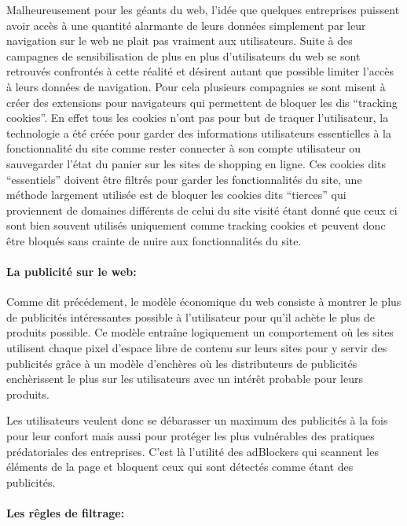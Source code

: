 \documentclass[oneside,a4paper,12pt]{article}
\begin{document}
Malheureusement pour les géants du web, l'idée que quelques entreprises puissent avoir accès à une quantité alarmante de leurs données simplement par leur navigation sur le web ne plait pas vraiment aux utilisateurs. Suite à des campagnes de sensibilisation de plus en plus d'utilisateurs du web se sont retrouvés confrontés à cette réalité et désirent autant que possible limiter l'accès à leurs données de navigation. Pour cela plusieurs compagnies se sont misent à créer des extensions pour navigateurs qui permettent de bloquer les dis ``tracking cookies''. En effet tous les cookies n'ont pas pour but de traquer l'utilisateur, la technologie a été créée pour garder des informations utilisateurs essentielles à la fonctionnalité du site comme rester connecter à son compte utilisateur ou sauvegarder l'état du panier sur les sites de shopping en ligne. Ces cookies dits ``essentiels'' doivent être filtrés pour garder les fonctionnalités du site, une méthode largement utilisée est de bloquer les cookies dits ``tierces'' qui proviennent de domaines différents de celui du site visité étant donné que ceux ci sont bien souvent utilisés uniquement comme tracking cookies et peuvent donc être bloqués sans crainte de nuire aux fonctionnalités du site.

\paragraph*{La publicité sur le web:}

Comme dit précédement, le modèle économique du web consiste à montrer le plus de publicités intéressantes possible à l'utilisateur pour qu'il achète le plus de produits possible. Ce modèle entraîne logiquement un comportement où les sites utilisent chaque pixel d'espace libre de contenu sur leurs sites pour y servir des publicités grâce à un modèle d'enchères où les distributeurs de publicités enchèrissent le plus sur les utilisateurs avec un intérêt probable pour leurs produits.

Les utilisateurs veulent donc se débarasser un maximum des publicités à la fois pour leur confort mais aussi pour protéger les plus vulnérables des pratiques prédatoriales des entreprises. C'est là l'utilité des adBlockers qui scannent les éléments de la page et bloquent ceux qui sont détectés comme étant des publicités.

\paragraph{Les rêgles de filtrage:}\label{Intro:adblock:filterlists}
\end{document}
